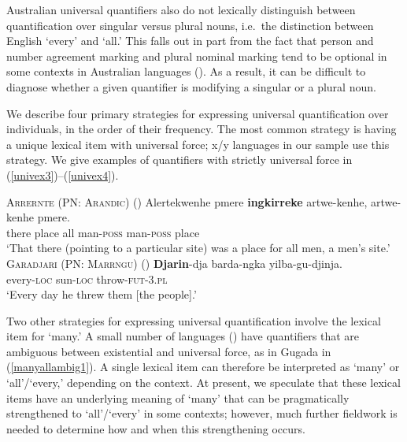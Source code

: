 \documentclass[12pt,egregdoesnotlikesansseriftitles]{scrartcl}
\begin{document}
Australian universal quantifiers also do not lexically distinguish between quantification over singular versus plural nouns, i.e.\ the distinction between English `every' and `all.' This falls out in part from the fact that person and number agreement marking and plural nominal marking tend to be optional in some contexts in Australian languages (). As a result, it can be difficult to diagnose whether a given quantifier is modifying a singular or a  plural noun. %


We describe four primary strategies for expressing universal quantification over individuals, in the order of their frequency. The most common strategy is having a unique lexical item with universal force;  x/y languages in our sample use this strategy. We give examples of quantifiers with strictly universal force in (\ref{univex3})--(\ref{univex4}).

\begin{exe}
  \ex  \textsc{Arrernte (PN: Arandic)} (\citealt[132]{wilkins89})
  \gll Alertekwenhe pmere \textbf{ingkirreke} artwe-kenhe, artwe-kenhe pmere.\\
  there place all man-\textsc{poss} man-\textsc{poss} place\\
  \glt `That there (pointing to a particular site) was a place for all men, a men's site.' \label{univex3}
  \ex  \textsc{Garadjari (PN: Marrngu)} (\citealt[48]{sands89}) 
  \gll \textbf{Djarin}-dja barda-ngka yilba-gu-djinja.\\
  every-\textsc{loc} sun-\textsc{loc}   throw-\textsc{fut}-3.\textsc{pl}\\
  \glt `Every day he threw them [the people].' \label{univex4}
\end{exe}

Two other strategies for expressing universal quantification  involve the lexical item for `many.' A small number of languages () have quantifiers that are ambiguous between existential and universal force, as in Gugada \textit{} in  (\ref{manyallambig1}). A single lexical item can therefore be interpreted as `many' or `all'/`every,' depending on the context. At present, we speculate that these lexical items have an underlying meaning of `many' that can be pragmatically strengthened to `all'/`every' in some contexts; however, much further fieldwork is needed to determine how and when this strengthening occurs.
\end{document}
